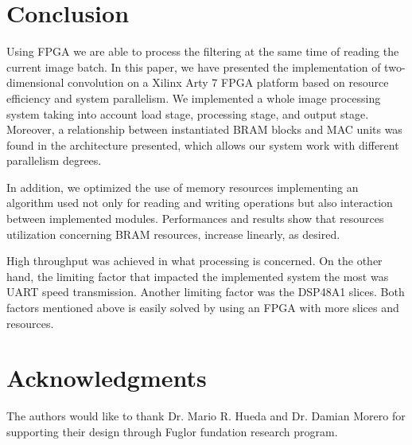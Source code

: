 \documentclass[conference,compsoc]{IEEEtran}
\begin{document}




\section{Conclusion}\label{sec:conclusion}
Using FPGA we are able to process the filtering at the same time of reading the
current image batch. In this paper, we have presented the implementation of
two-dimensional convolution on a Xilinx Arty 7 FPGA platform based on resource
efficiency and system parallelism. We implemented a whole image processing
system taking into account load stage, processing stage, and output stage.
Moreover, a relationship between instantiated BRAM blocks and MAC units was
found in the architecture presented, which allows our system work with different
parallelism degrees.

In addition, we optimized the use of memory resources implementing an algorithm
used not only for reading and writing operations but also interaction between
implemented modules. Performances and results show that resources utilization
concerning BRAM resources, increase linearly, as desired.

High throughput was achieved in what processing is concerned. On the other hand,
the limiting factor that impacted the implemented system the most was UART speed
transmission. Another limiting factor was the DSP48A1 slices. Both factors
mentioned above is easily solved by using an FPGA with more slices and
resources.






\ifCLASSOPTIONcompsoc
  \section*{Acknowledgments}
The authors would like to thank Dr. Mario R. Hueda and Dr. Damian Morero for supporting their
design through Fuglor fundation research program.
\end{document}
